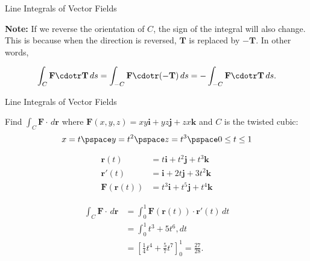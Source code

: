 \documentclass[11pt,english,
handout
]{beamer}
\begin{document}
\begin{frame}{Line Integrals of Vector Fields}
\small

\textbf{Note:} If we reverse the orientation of $C$, the sign of the integral will also change. This is because when the direction is reversed, $\mathbf{T}$ is replaced by $-\mathbf{T}$. In other words,

\[
\int_C\mathbf{F}\cdotr\mathbf{T}\,ds=\int_{-C}\mathbf{F}\cdotr(\mathbf{-T})\,ds=-\int_{-C}\mathbf{F}\cdotr\mathbf{T}\,ds.
\]
\end{frame}












\begin{frame}[t]{Line Integrals of Vector Fields}
\small
\begin{example}
Find $\displaystyle \int_C\mathbf{F}\cdot\,d\mathbf{r}$ where $\mathbf{F}(x,y,z)=xy\mathbf{i}+yz\mathbf{j}+zx\mathbf{k}$ and $C$ is the twisted cubic:
\[
x=t\pspace y=t^2\pspace z=t^3\pspace 0\leq t\leq 1
\]\pause


\begin{minipage}[t]{0.5\textwidth}
\begin{align*}
\mathbf{r}(t)&=t\mathbf{i}+t^2\mathbf{j}+t^3\mathbf{k}\\[5mm]
\mathbf{r}'(t)&=\mathbf{i}+2t\mathbf{j}+3t^2\mathbf{k}\\[5mm]
\mathbf{F}(\mathbf{r}(t))&=t^3\mathbf{i}+t^5\mathbf{j}+t^4\mathbf{k}
\end{align*}
\end{minipage}%
\begin{minipage}[t]{0.5\textwidth}
\begin{align*}
\int_C\mathbf{F}\cdot\,d\mathbf{r}&= \int_0^1\mathbf{F}(\mathbf{r}(t))\cdot\mathbf{r}'(t)\,dt\\[2mm]
&=\int_0^1t^3+5t^6,dt\\[2mm]
&=\left[\frac{1}{4}t^4+\frac{5}{7}t^7\right]_0^1=\frac{27}{28}.
\end{align*}
\end{minipage}
\end{example}
\end{frame}
\end{document}
